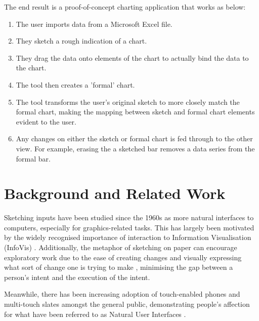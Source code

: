 The end result is a proof-of-concept charting application that works as below:
\begin{enumerate}
\item The user imports data from a Microsoft Excel file.
\item They sketch a rough indication of a chart.
\item They drag the data onto elements of the chart to actually bind the data to the chart. 
\item The tool then creates a 'formal' chart.
\item The tool transforms the user's original sketch to more closely match the formal chart, making the mapping between sketch and formal chart elements evident to the user.
\item Any changes on either the sketch or formal chart is fed through to the other view. For example, erasing the a sketched bar removes a data series from the formal bar.
\end{enumerate}

\section{Background and Related Work}
Sketching inputs have been studied since the 1960s \citep{Sutherland1964} as more natural interfaces to computers, especially for graphics-related tasks. This has largely been motivated by the widely recognised importance of interaction to Information Visualisation (InfoVis) \citep{Lee2012}. Additionally, the metaphor of sketching on paper can encourage exploratory work due to the ease of creating changes and visually expressing what sort of change one is trying to make \citep{Citation Needed}, minimising the gap between a person's intent and the execution of the intent.

Meanwhile, there has been increasing adoption of touch-enabled phones and multi-touch slates amongst the general public, demonstrating people's affection for what have been referred to as Natural User Interfaces \cite{Lee2012}.